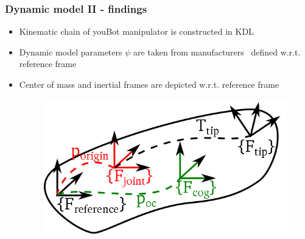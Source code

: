 \documentclass{beamer}
\begin{document}
\begin{frame}
	\frametitle{Dynamic model II - findings}
	\vspace{-0.5cm}
	\begin{itemize}
	\item Kinematic chain of youBot manipulator is constructed in KDL
	\item Dynamic model parameters $\psi$ are taken from manufacturers~\cite{p13} defined w.r.t. reference frame
	\item Center of mass and inertial frames are depicted w.r.t. reference frame
\begin{figure}
\centering
\begin{minipage}{.4\textwidth}
  \centering
  \includegraphics[trim=0 20 0 20,width=0.9\linewidth]{images/kdl_segment}
\end{minipage}
\pause
\begin{minipage}{.4\textwidth}
  \centering
\vspace{-2.3cm}

\end{minipage}
\end{figure}
\end{itemize}
\end{frame}
\end{document}
